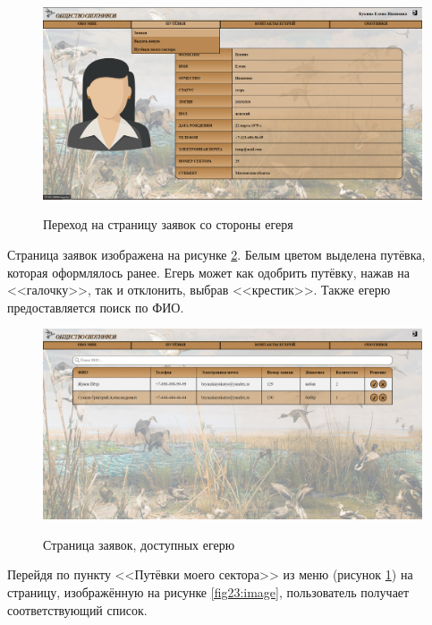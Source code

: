 	\begin{figure}[h]
		\centering
		\begin{center}
			{\includegraphics[scale=0.34]{schemes/screens/huntsman_start.png}}
			\caption{Переход на страницу заявок со стороны егеря}
			\label{fig20:image}
		\end{center}
	\end{figure}
	\newpage

	Страница заявок изображена на рисунке \ref{fig21:image}. Белым цветом выделена путёвка, которая оформлялось ранее. Егерь может как одобрить путёвку, нажав на <<галочку>>, так и отклонить, выбрав <<крестик>>. Также егерю предоставляется поиск по ФИО.

	\begin{figure}[h]
		\centering
		\begin{center}
			{\includegraphics[scale=0.321]{schemes/screens/requests_huntsman.png}}
			\caption{Страница заявок, доступных егерю}
			\label{fig21:image}
		\end{center}
	\end{figure}

	Перейдя по пункту <<Путёвки моего сектора>> из меню (рисунок \ref{fig20:image}) на страницу, изображённую на рисунке \ref{fig23:image}, пользователь получает соответствующий список.
	
